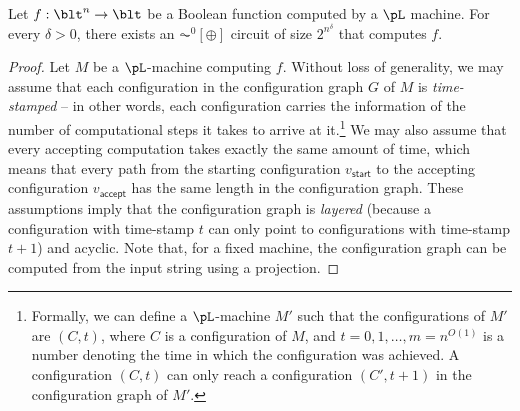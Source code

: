 \documentclass[11pt]{article}
\begin{document}
\begin{lemma}
    \label{lemma:pl-to-ac02}
    Let $f : \blt^n \to \blt$
    be a Boolean function computed by
    a $\pL$ machine.
    For every $\delta > 0$,
    there exists an $\AC^0[\oplus]$ circuit
    of size $2^{n^\delta}$ that computes $f$.
\end{lemma}
\begin{proof}
    Let $M$ be a $\pL$-machine computing $f$.
    Without loss of generality, we may assume that
    each configuration in the 
    configuration graph $G$ of $M$
    is \emph{time-stamped} -- in other words,
    each configuration 
    carries the information of the number of
    computational steps it takes to arrive at it.\footnote{Formally,
        we can define a $\pL$-machine $M'$ such that
        the configurations of $M'$
        are
        $(C,t)$, where
        $C$ is a configuration of $M$, and $t = 0,1,\dots,m = n^{O(1)}$
        is a number denoting the time in which the configuration was
        achieved.
        A configuration $(C,t)$ can only reach a configuration
        $(C',t+1)$ in the configuration graph of $M'$.
    }
    We may also assume that
    every accepting computation takes exactly the same amount of time,
    which means that every path from the starting configuration
    $v_{\mathsf{start}}$
    to the accepting configuration
    $v_{\mathsf{accept}}$
    has the same length in the configuration graph.
    These assumptions imply that the configuration graph is \emph{layered} 
    (because a configuration with time-stamp $t$
        can only 
        point to
    configurations with time-stamp $t+1$)
    and acyclic.
    Note that, for a fixed machine,
    the configuration graph can be computed from the input string using a projection.  


\end{proof}
\end{document}
